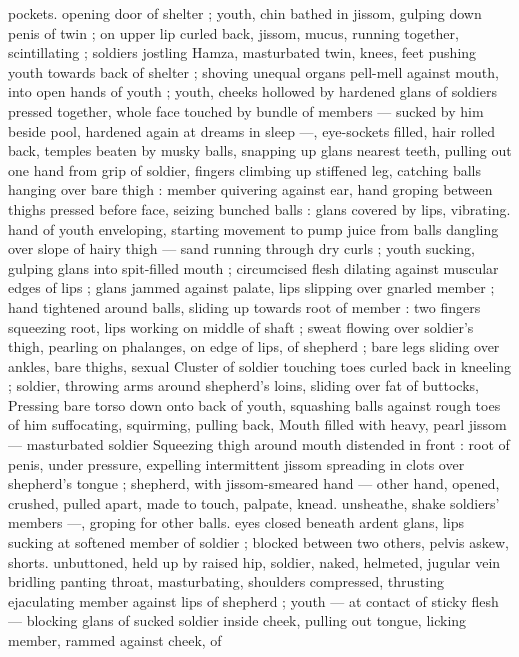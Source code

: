 pockets. opening door of shelter ; youth, chin bathed in jissom, 
gulping down penis of twin ; on upper lip curled back, jissom, mucus, 
running together, scintillating ; soldiers jostling Hamza, masturbated 
twin, knees, feet pushing youth towards back of shelter ; shoving 
unequal organs pell-mell against mouth, into open hands of youth ; 
youth, cheeks hollowed by hardened glans of soldiers pressed 
together, whole face touched by bundle of members --- sucked by 
him beside pool, hardened again at dreams in sleep ---, eye-sockets 
filled, hair rolled back, temples beaten by musky balls, snapping up 
glans nearest teeth, pulling out one hand from grip of soldier, fingers 
climbing up stiffened leg, catching balls hanging over bare thigh : 
member quivering against ear, hand groping between thighs pressed 
before face, seizing bunched balls : glans covered by lips, vibrating. 
hand of youth enveloping, starting movement to pump juice from 
balls dangling over slope of hairy thigh --- sand running through dry 
curls ; youth sucking, gulping glans into spit-filled mouth ; 
circumcised flesh dilating against muscular edges of lips ; glans 
jammed against palate, lips slipping over gnarled member ; hand 
tightened around balls, sliding up towards root of member : two 
fingers squeezing root, lips working on middle of shaft ; sweat 
flowing over soldier's thigh, pearling on phalanges, on edge of lips, 
of shepherd ; bare legs sliding over ankles, bare thighs, sexual 
Cluster of soldier touching toes curled back in kneeling ; soldier, 
throwing arms around shepherd's loins, sliding over fat of buttocks, 
Pressing bare torso down onto back of youth, squashing balls 
against rough toes of him suffocating, squirming, pulling back, 
Mouth filled with heavy, pearl jissom --- masturbated soldier 
Squeezing thigh around mouth distended in front : root of penis, 
under pressure, expelling intermittent jissom spreading in clots over 
shepherd's tongue ; shepherd, with jissom-smeared hand --- other 
hand, opened, crushed, pulled apart, made to touch, palpate, knead. 
unsheathe, shake soldiers' members ---, groping for other balls. 
eyes closed beneath ardent glans, lips sucking at softened member 
of soldier ; blocked between two others, pelvis askew, shorts. 
unbuttoned, held up by raised hip, soldier, naked, helmeted, jugular 
vein bridling panting throat, masturbating, shoulders compressed, 
thrusting ejaculating member against lips of shepherd ; youth --- at 
contact of sticky flesh --- blocking glans of sucked soldier inside 
cheek, pulling out tongue, licking member, rammed against cheek, of 
